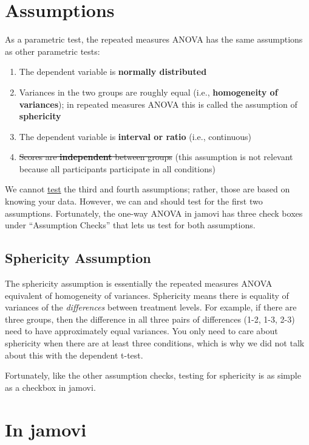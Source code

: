 \documentclass[
]{book}
\begin{document}
\hypertarget{assumptions-2}{%
\section{Assumptions}\label{assumptions-2}}

As a parametric test, the repeated measures ANOVA has the same assumptions as other parametric tests:

\begin{enumerate}
\def\labelenumi{\arabic{enumi}.}
\item
  The dependent variable is \textbf{normally distributed}
\item
  Variances in the two groups are roughly equal (i.e., \textbf{homogeneity of variances}); in repeated measures ANOVA this is called the assumption of \textbf{sphericity}
\item
  The dependent variable is \textbf{interval or ratio} (i.e., continuous)
\item
  \sout{Scores are \textbf{independent} between groups} (this assumption is not relevant because all participants participate in all conditions)
\end{enumerate}

We cannot \underline{test} the third and fourth assumptions; rather, those are based on knowing your data. However, we can and should test for the first two assumptions. Fortunately, the one-way ANOVA in jamovi has three check boxes under ``Assumption Checks'' that lets us test for both assumptions.

\hypertarget{sphericity-assumption}{%
\subsection{Sphericity Assumption}\label{sphericity-assumption}}

The sphericity assumption is essentially the repeated measures ANOVA equivalent of homogeneity of variances. Sphericity means there is equality of variances of the \emph{differences} between treatment levels. For example, if there are three groups, then the difference in all three pairs of differences (1-2, 1-3, 2-3) need to have approximately equal variances. You only need to care about sphericity when there are at least three conditions, which is why we did not talk about this with the dependent t-test.

Fortunately, like the other assumption checks, testing for sphericity is as simple as a checkbox in jamovi.

\hypertarget{in-jamovi-1}{%
\section{In jamovi}\label{in-jamovi-1}}
\end{document}
